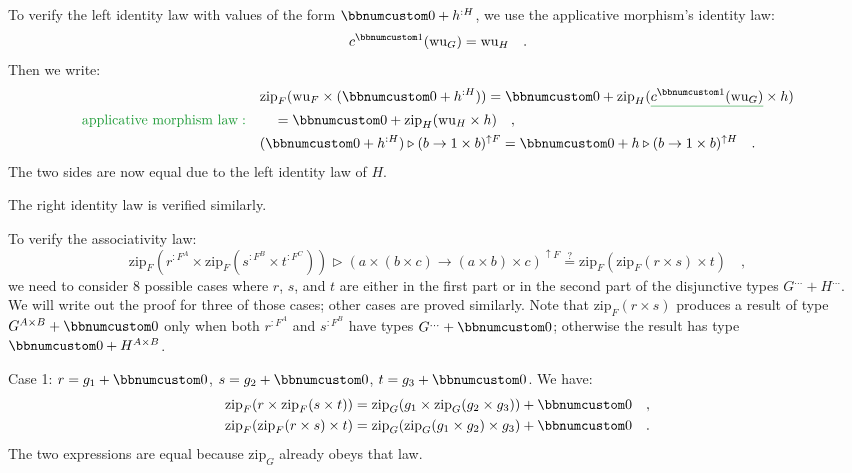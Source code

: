 To verify the left identity law with values of the form $\bbnum 0+h^{:H}$,
we use the applicative morphism\textsf{'}s identity law:
\[
c^{\bbnum 1}(\text{wu}_{G})=\text{wu}_{H}\quad.
\]
Then we write:
\begin{align*}
 & \text{zip}_{F}(\text{wu}_{F}\times(\bbnum 0+h^{:H}))=\bbnum 0+\text{zip}_{H}(\gunderline{c^{\bbnum 1}(\text{wu}_{G})}\times h)\\
{\color{greenunder}\text{applicative morphism law}:}\quad & \quad=\bbnum 0+\text{zip}_{H}(\text{wu}_{H}\times h)\quad,\\
 & (\bbnum 0+h^{:H})\triangleright(b\rightarrow1\times b)^{\uparrow F}=\bbnum 0+h\triangleright(b\rightarrow1\times b)^{\uparrow H}\quad.
\end{align*}
The two sides are now equal due to the left identity law of $H$.

The right identity law is verified similarly.

To verify the associativity law:
\[
\text{zip}_{F}(r^{:F^{A}}\times\text{zip}_{F}(s^{:F^{B}}\times t^{:F^{C}}))\triangleright(a\times(b\times c)\rightarrow(a\times b)\times c)^{\uparrow F}\overset{?}{=}\text{zip}_{F}(\text{zip}_{F}(r\times s)\times t)\quad,
\]
we need to consider 8 possible cases where $r$, $s$, and $t$ are
either in the first part or in the second part of the disjunctive
types $G^{...}+H^{...}$. We will write out the proof for three of
those  cases; other cases are proved similarly. Note that $\text{zip}_{F}(r\times s)$
produces a result of type $G^{A\times B}+\bbnum 0$ only when both
$r^{:F^{A}}$ and $s^{:F^{B}}$ have types $G^{...}+\bbnum 0$; otherwise
the result has type $\bbnum 0+H^{A\times B}$.

Case 1: $r=g_{1}+\bbnum 0$, $s=g_{2}+\bbnum 0$, $t=g_{3}+\bbnum 0$.
We have:
\begin{align*}
 & \text{zip}_{F}(r\times\text{zip}_{F}(s\times t))=\text{zip}_{G}(g_{1}\times\text{zip}_{G}(g_{2}\times g_{3}))+\bbnum 0\quad,\\
 & \text{zip}_{F}(\text{zip}_{F}(r\times s)\times t)=\text{zip}_{G}(\text{zip}_{G}(g_{1}\times g_{2})\times g_{3})+\bbnum 0\quad.
\end{align*}
The two expressions are equal because $\text{zip}_{G}$ already obeys
that law.

